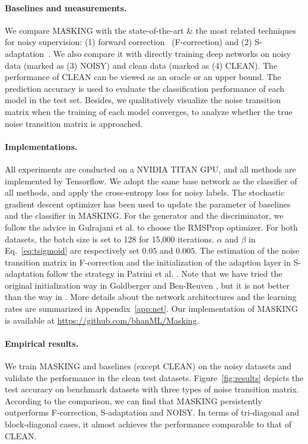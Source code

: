 \documentclass{article}
\begin{document}
\paragraph{Baselines and measurements.} We compare MASKING with the state-of-the-art \& the most related techniques for noisy supervision: (1) forward correction~\cite{patrini2017making} (F-correction) and (2) S-adaptation~\cite{goldberger2016training}. We also compare it with directly training deep networks on noisy data (marked as (3) NOISY) and clean data (marked as (4) CLEAN). The performance of CLEAN can be viewed as an oracle or an upper bound. The prediction accuracy is used to evaluate the classification performance of each model in the test set. Besides, we qualitatively visualize the noise transition matrix when the training of each model converges, to analyze whether the true noise transition matrix is approached.
\paragraph{Implementations.} All experiments are conducted on a NVIDIA TITAN GPU, and all methods are implemented by Tensorflow. We adopt the same base network as the classifier of all methods, and apply the cross-entropy loss for noisy labels. The stochastic gradient descent optimizer has been used to update the parameter of baselines and the classifier in MASKING. For the generator and the discriminator, we follow the advice in Gulrajani et al. \cite{wgan} to choose the RMSProp optimizer. For both datasets, the batch size is set to 128 for 15,000 iterations. $\alpha$ and $\beta$ in Eq.~\eqref{eq:tsigmoid} are respectively set $0.05$ and $0.005$. The estimation of the noise transition matrix in F-correction and the initialization of the adaption layer in S-adaptation follow the strategy in Patrini et al. \cite{patrini2017making}. Note that we have tried the original initialization way in Goldberger and Ben-Reuven \cite{goldberger2016training}, but it is not better than the way in \cite{patrini2017making}. More details about the network architectures and the learning rates are summarized in Appendix~\ref{app:net}. Our implementation of MASKING is available at \url{https://github.com/bhanML/Masking}.
\paragraph{Empirical results.} We train MASKING and baselines (except CLEAN) on the noisy datasets and validate the performance in the clean test datasets. Figure~\ref{fig:results} depicts the test accuracy on benchmark datasets with three types of noise transition matrix. According to the comparison, we can find that MASKING persistently outperforms F-correction, S-adaptation and NOISY. In terms of tri-diagonal and block-diagonal cases, it almost achieves the performance comparable to that of CLEAN.
\end{document}
